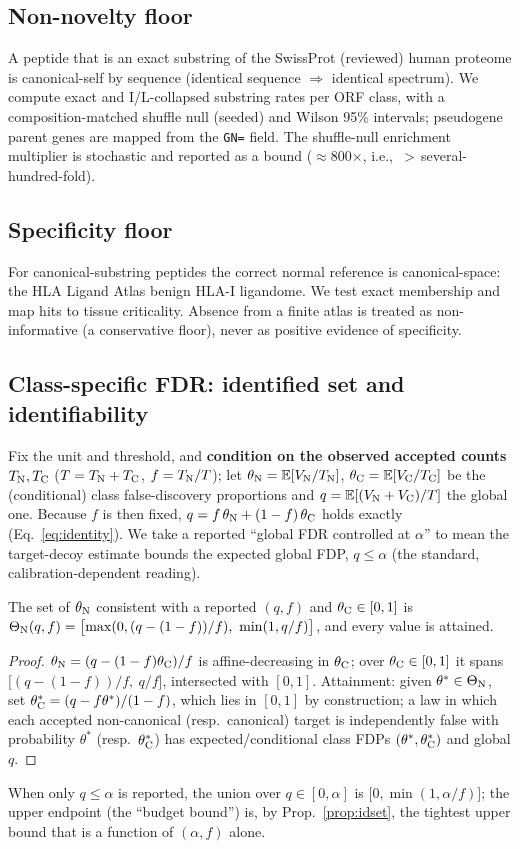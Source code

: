 \subsection{Non-novelty floor}
A peptide that is an exact substring of the SwissProt (reviewed) human proteome is canonical-self by sequence (identical sequence $\Rightarrow$ identical spectrum). We compute exact and I/L-collapsed substring rates per ORF class, with a composition-matched shuffle null (seeded) and Wilson 95\% intervals; pseudogene parent genes are mapped from the \texttt{GN=} field. The shuffle-null enrichment multiplier is stochastic and reported as a bound ($\approx$800$\times$, i.e.,\ ${>}$\,several-hundred-fold).

\subsection{Specificity floor}
For canonical-substring peptides the correct normal reference is canonical-space: the HLA Ligand Atlas benign HLA-I ligandome. We test exact membership and map hits to tissue criticality. Absence from a finite atlas is treated as non-informative (a conservative floor), never as positive evidence of specificity.

\subsection{Class-specific FDR: identified set and identifiability}
Fix the unit and threshold, and \textbf{condition on the observed accepted counts} $T_{\mathrm{N}},T_{\mathrm{C}}$ ($T=T_{\mathrm{N}}+T_{\mathrm{C}}$, $f=T_{\mathrm{N}}/T$); let $\theta_{\mathrm{N}}=\mathbb{E}[V_{\mathrm{N}}/T_{\mathrm{N}}]$, $\theta_{\mathrm{C}}=\mathbb{E}[V_{\mathrm{C}}/T_{\mathrm{C}}]$ be the (conditional) class false-discovery proportions and $q=\mathbb{E}[(V_{\mathrm{N}}+V_{\mathrm{C}})/T]$ the global one. Because $f$ is then fixed, $q = f\,\theta_{\mathrm{N}} + (1-f)\,\theta_{\mathrm{C}}$ holds exactly (Eq.~\ref{eq:identity}). We take a reported ``global FDR controlled at $\alpha$'' to mean the target-decoy estimate bounds the expected global FDP, $q \le \alpha$ (the standard, calibration-dependent reading).

\begin{proposition}\label{prop:idset}
The set of $\theta_{\mathrm{N}}$ consistent with a reported $(q,f)$ and $\theta_{\mathrm{C}}\in[0,1]$ is $\SetN(q,f)=\bigl[\max(0,(q-(1-f))/f),\ \min(1,q/f)\bigr]$, and every value is attained.
\end{proposition}
\begin{proof}
$\theta_{\mathrm{N}}=(q-(1-f)\theta_{\mathrm{C}})/f$ is affine-decreasing in $\theta_{\mathrm{C}}$; over $\theta_{\mathrm{C}}\in[0,1]$ it spans $\bigl[(q-(1-f))/f,\ q/f\bigr]$, intersected with $[0,1]$. Attainment: given $\theta^{*}\in\Theta_{\mathrm{N}}$, set $\theta_{\mathrm{C}}^{*}=(q-f\theta^{*})/(1-f)$, which lies in $[0,1]$ by construction; a law in which each accepted non-canonical (resp.\ canonical) target is independently false with probability $\theta^{*}$ (resp.\ $\theta_{\mathrm{C}}^{*}$) has expected/conditional class FDPs $(\theta^{*},\theta_{\mathrm{C}}^{*})$ and global $q$.
\end{proof}
\noindent When only $q\le\alpha$ is reported, the union over $q\in[0,\alpha]$ is $\bigl[0,\min(1,\alpha/f)\bigr]$; the upper endpoint (the ``budget bound'') is, by Prop.~\ref{prop:idset}, the tightest upper bound that is a function of $(\alpha,f)$ alone.

